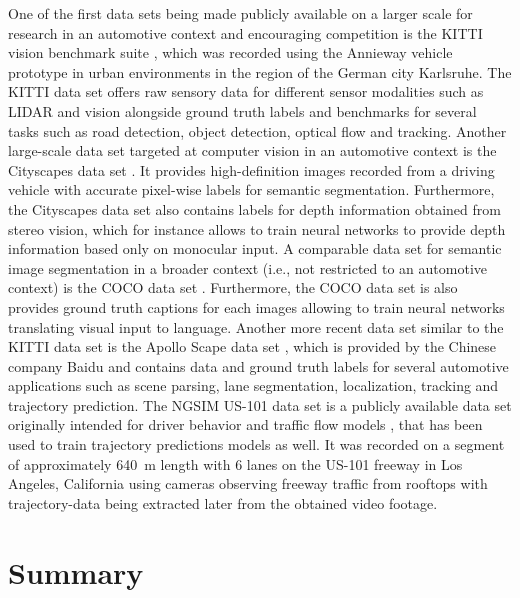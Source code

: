 One of the first data sets being made publicly available on a larger scale for research in an automotive context and encouraging competition is the KITTI vision benchmark suite \cite{Geiger2013a}, which was recorded using the Annieway vehicle prototype \cite{Annieway} in urban environments in the region of the German city Karlsruhe.
The KITTI data set offers raw sensory data for different sensor modalities such as \ac{LIDAR} and vision alongside ground truth labels and benchmarks for several tasks such as road detection, object detection, optical flow and tracking.
Another large-scale data set targeted at computer vision in an automotive context is the Cityscapes data set \cite{Cordts2016}. 
It provides high-definition images recorded from a driving vehicle with accurate pixel-wise labels for semantic segmentation.
Furthermore, the Cityscapes data set also contains labels for depth information obtained from stereo vision, which for instance allows to train neural networks to provide depth information based only on monocular input. 
A comparable data set for semantic image segmentation in a broader context (i.e., not restricted to an automotive context) is the 
\ac{COCO}  data set \cite{Lin2014}.
Furthermore, the \ac{COCO} data set is also provides ground truth captions for each images allowing to train neural networks translating visual input to language. 
Another more recent data set similar to the KITTI data set is the Apollo Scape data set \cite{Huang2018}, which is provided by the Chinese company Baidu and contains data and ground truth labels for several automotive applications such as scene parsing, lane segmentation, localization, tracking and trajectory prediction.
The \ac{NGSIM} US-101 data set \cite{NGSIM-US101} is a publicly available data set originally intended for driver behavior and traffic flow models \cite{He2017}, that has been used to train trajectory predictions models \cite{Altche2018, Deo2018} as well.
It was recorded on a segment of approximately \SI{640}{\meter} length with \num{6} lanes on the US-101 freeway in Los Angeles, California  using cameras observing freeway traffic from rooftops with trajectory-data being extracted later from the obtained video footage.

\section{Summary}
\label{sec:related_work_summary}


